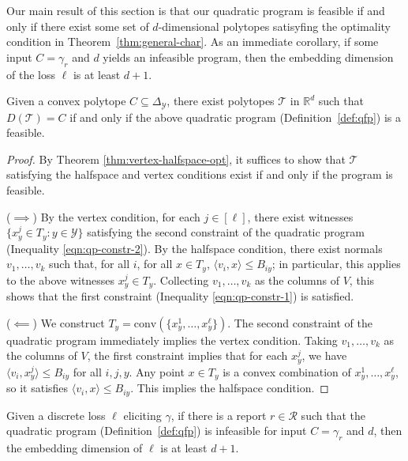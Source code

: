 \documentclass[final]{colt2020} %
\newcommand{\reals}{\mathbb{R}}
\newcommand{\simplex}{\Delta_\Y}
\newcommand{\R}{\mathcal{R}}
\newcommand{\T}{\mathcal{T}}
\newcommand{\Y}{\mathcal{Y}}
\newcommand{\inprod}[2]{\langle #1, #2 \rangle}%
\newcommand{\conv}{\mathrm{conv}}
\DeclareMathOperator*{\argmin}{arg\,min}
\begin{document}
Our main result of this section is that our quadratic program is feasible if and only if there exist some set of $d$-dimensional polytopes satisyfing the optimality condition in Theorem~\ref{thm:general-char}.
As an immediate corollary, if some input $C=\gamma_r$ and $d$ yields an infeasible program, then the embedding dimension of the loss $\ell$ is at least $d+1$.
\begin{theorem} \label{thm:opt-iff-qfp}
  Given a convex polytope $C \subseteq \simplex$, there exist polytopes $\T$ in $\reals^d$ such that $D(\T) = C$ if and only if the above quadratic program (Definition~\ref{def:qfp}) is a feasible.
\end{theorem}
\begin{proof}
    By Theorem \ref{thm:vertex-halfspace-opt}, it suffices to show that $\T$ satisfying the halfspace and vertex conditions exist if and only if the program is feasible.

  ($\implies$)
  By the vertex condition, for each $j \in [\ell]$, there exist witnesses $\{x^j_y \in T_y : y \in \Y\}$ satisfying the second constraint of the quadratic program (Inequality \ref{eqn:qp-constr-2}).
  By the halfspace condition, there exist normals $v_1, \dots, v_k$ such that, for all $i$, for all $x \in T_y$, $\inprod{v_i}{x} \leq B_{iy}$; in particular, this applies to the above witnesses $x^j_y \in T_y$.
  Collecting $v_1,\dots,v_k$ as the columns of $V$, this shows that the first constraint (Inequality \ref{eqn:qp-constr-1}) is satisfied.

  ($\impliedby$)
  We construct $T_y = \conv(\{x^1_y, \ldots, x^{\ell}_y\})$.
  The second constraint of the quadratic program immediately implies the vertex condition.
  Taking $v_1,\dots,v_k$ as the columns of $V$, the first constraint implies that for each $x^j_y$, we have $\inprod{v_i}{x^j_y} \leq B_{iy}$ for all $i,j,y$.
  Any point $x \in T_y$ is a convex combination of $x^1_y,\ldots,x^{\ell}_y$, so it satisfies $\inprod{v_i}{x} \leq B_{iy}$.
  This implies the halfspace condition.  %
\end{proof}

\begin{corollary}\label{cor:d-embeddable-char}
  Given a discrete loss $\ell$ eliciting $\gamma$, if there is a report $r\in\R$ such that the quadratic program (Definition~\ref{def:qfp}) is infeasible for input $C = \gamma_r$ and $d$, then the embedding dimension of $\ell$ is at least $d+1$.
\end{corollary}
\end{document}

